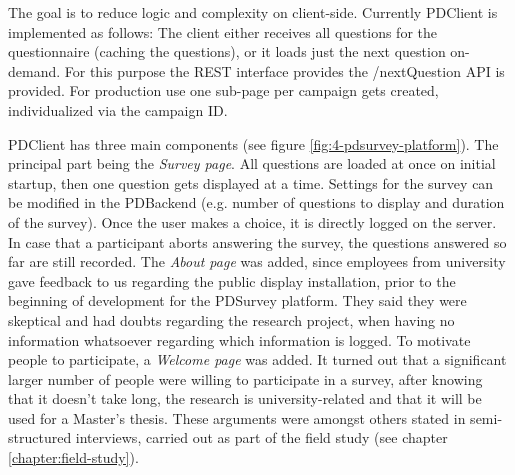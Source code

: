 		The goal is to reduce logic and complexity on client-side. Currently PDClient is implemented as follows: The client either receives all questions for the questionnaire (caching the questions), or it loads just the next question on-demand. For this purpose the REST interface provides the /nextQuestion API is provided. For production use one sub-page per campaign gets created, individualized via the campaign ID.
		

		PDClient has three main components (see figure \ref{fig:4-pdsurvey-platform}). The principal part being the \textit{Survey page}. All questions are loaded at once on initial startup, then one question gets displayed at a time. Settings for the survey can be modified in the PDBackend (e.g. number of questions to display and duration of the survey). Once the user makes a choice, it is directly logged on the server. In case that a participant aborts answering the survey, the questions answered so far are still recorded. The \textit{About page} was added, since employees from university gave feedback to us regarding the public display installation, prior to the beginning of development for the PDSurvey platform. They said they were skeptical and had doubts regarding the research project, when having no information whatsoever regarding which information is logged. To motivate people to participate, a \textit{Welcome page} was added. It turned out that a significant larger number of people were willing to participate in a survey, after knowing that it doesn't take long, the research is university-related and that it will be used for a Master's thesis. These arguments were amongst others stated in semi-structured interviews, carried out as part of the field study (see chapter \ref{chapter:field-study}).





